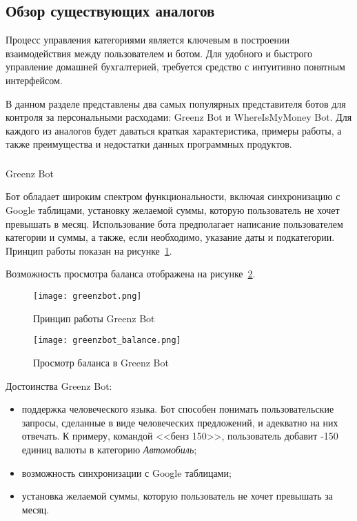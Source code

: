 \subsection{Обзор существующих аналогов}
\label{sec:analysis:analogues}

Процесс управления категориями является ключевым в построении взаимодействия между пользователем и ботом. Для удобного и быстрого управление домашней бухгалтерией, требуется средство с интуитивно понятным интерфейсом.

В данном разделе представлены два самых популярных представителя ботов для контроля за персональными расходами: Greenz Bot и WhereIsMyMoney Bot. Для каждого из аналогов будет даваться краткая характеристика, примеры работы, а также преимущества и недостатки данных программных продуктов.

\subsubsection{} Greenz Bot
\label{sec:analysis:analogues:greenz}

Бот обладает широким спектром функциональности, включая синхронизацию с Google таблицами, установку желаемой суммы, которую пользователь не хочет превышать в месяц. Использование бота предполагает написание пользователем категории и суммы, а также, если необходимо, указание даты и подкатегории. Принцип работы показан на рисунке~\ref{fig:analysis:analogues:greenz}.

Возможность просмотра баланса отображена на рисунке~\ref{fig:analysis:analogues:greenz_balance}.

\begin{figure}
	\centering
	\texttt{[image: greenzbot.png]} 
	\caption{Принцип работы Greenz Bot}
	\label{fig:analysis:analogues:greenz}
\end{figure}

\begin{figure}
	\centering
	\texttt{[image: greenzbot\_balance.png]} 
	\caption{Просмотр баланса в Greenz Bot}
	\label{fig:analysis:analogues:greenz_balance}
\end{figure}

Достоинства Greenz Bot:

\begin{itemize}
	\item поддержка человеческого языка. Бот способен понимать пользовательские запросы, сделанные в виде человеческих предложений, и адекватно на них отвечать. К примеру, командой <<бенз 150>>, пользователь добавит -150 единиц валюты в категорию \emph{Автомобиль};
	\item возможность синхронизации с Google таблицами;
	\item установка желаемой суммы, которую пользователь не хочет превышать за месяц.
\end{itemize}


